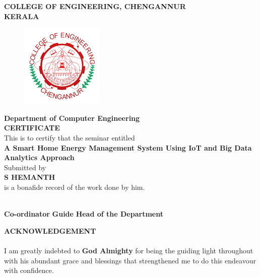 \documentclass[a4paper,12pt,oneside]{article}
\begin{document}
\newpage
\thispagestyle{empty}
\begin{center}
\setlength{\baselineskip}{1.5\baselineskip}
{\large\textbf{COLLEGE OF ENGINEERING, CHENGANNUR}}
\\
{\large\textbf{KERALA}}
\\
\begin{figure}[H]
\centering
\includegraphics{ceclogo.png}
\end{figure}
\setlength{\baselineskip}{1.5\baselineskip}
\textbf{Department of Computer Engineering}
\\
\textbf{CERTIFICATE}
\\
This is to certify that the seminar entitled
\\
\textbf{A Smart Home Energy Management System
Using IoT and Big Data Analytics Approach}
\\
Submitted by
\\
\textbf{S HEMANTH}
\\
is a bonafide record of the work done by him.
\end{center}
\vspace{30ex}
\hspace{55ex}
\\

\hspace{0ex}
\textbf{Co-ordinator}
\hspace{18ex}
\textbf{Guide}
\hspace{18ex}
\textbf{Head of the Department}
\newpage
{}
\renewcommand{\headrulewidth}{0.0pt}
\renewcommand{\footrulewidth}{0.0pt}
\begin{center}
\large{\textbf{ACKNOWLEDGEMENT}}
\end{center}
\vspace{6ex}
\setlength{\baselineskip}{1.5\baselineskip}
\paragraph{}
I am greatly indebted to \textbf{God Almighty} for being the guiding light throughout with his
abundant grace and blessings that strengthened me to do this endeavour with confidence.
\end{document}
